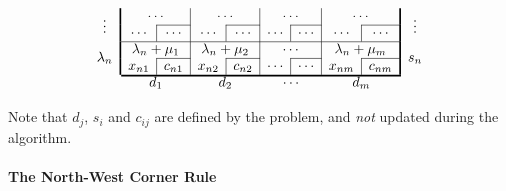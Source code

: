 \documentclass[11pt]{article}
\theoremstyle{definition}
\theoremstyle{remark}
\begin{document}
\begin{table}[ht!]
\[\begin{array}{c
            !{\vrule width 1.2pt}
            cc|cc|cc|cc|c}
            \multirow{2}{*}{\vdots}
            &
            \multicolumn{2}{c|}{\cdots} &
            \multicolumn{2}{c|}{\cdots} &
            \multicolumn{2}{c|}{\cdots} &
            \multicolumn{2}{c!{\vrule width 1.2pt}}{\cdots} &
            \multirow{2}{*}{\vdots}
            \\

            \cline{3-3}
            \cline{5-5}
            \cline{7-7}
            \cline{9-9}

            &
            \cdots & \multicolumn{1}{|c|}{\cdots} &
            \cdots & \multicolumn{1}{|c|}{\cdots} &
            \cdots & \multicolumn{1}{|c|}{\cdots} &
            \cdots & \multicolumn{1}{|c!{\vrule width 1.2pt}}{\cdots} &
            \\

            \cline{2-9}

            \multirow{2}{*}{\(\lambda_n\)}
            &
            \multicolumn{2}{c|}{\lambda_n+\mu_1} &
            \multicolumn{2}{c|}{\lambda_n+\mu_2} &
            \multicolumn{2}{c|}{\cdots} &
            \multicolumn{2}{c!{\vrule width 1.2pt}}{\lambda_n+\mu_m} &
            \multirow{2}{*}{\(s_n\)}
            \\

            \cline{3-3}
            \cline{5-5}
            \cline{7-7}
            \cline{9-9}
            &
            x_{n1} & \multicolumn{1}{|c|}{c_{n1}} &
            x_{n2} & \multicolumn{1}{|c|}{c_{n2}} &
            \cdots & \multicolumn{1}{|c|}{\cdots} &
            x_{nm} & \multicolumn{1}{|c!{\vrule width 1.2pt}}{c_{nm}} &
            \\

            \noalign{\global\arrayrulewidth=1.2pt}
            \cline{2-9}
            \noalign{\global\arrayrulewidth=0.4pt}

            \multicolumn{1}{c}{} &
            \multicolumn{2}{c}{d_1} &
            \multicolumn{2}{c}{d_2} &
            \multicolumn{2}{c}{\cdots} &
            \multicolumn{2}{c}{d_m} &

        \end{array}
        \renewcommand{\arraystretch}{1}
    \]
    \caption{Transport Tableau}
    \label{tab:transport-tableau}%
\end{table}

Note that \(d_j\), \(s_i\) and \(c_{ij}\) are defined by the problem, and \emph{not} updated during the algorithm.

\paragraph{The North-West Corner Rule}
\end{document}
